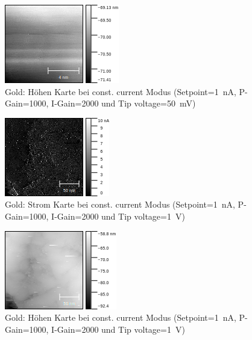 \documentclass[sn-mathphys-num,iicol]{sn-jnl}
\theoremstyle{thmstyleone}
\theoremstyle{thmstyletwo}
\theoremstyle{thmstylethree}
\begin{document}
\begin{figure}[t]
        \centering
        \includegraphics[width=.5\textwidth]{../data/Gold_10nm_50mV_z.png}
        \caption{Gold: Höhen Karte bei const. current Modus (Setpoint=\SI{1}{\nano A}, P-Gain=\SI{1000}{}, I-Gain=\SI{2000}{} und Tip voltage=\SI{50}{\milli V})} \label{fig:g10nm50mVz}
\end{figure}
\begin{figure}[t]
        \centering
        \includegraphics[width=.5\textwidth]{../data/Gold_200nm_current.png}
        \caption{Gold: Strom Karte bei const. current Modus (Setpoint=\SI{1}{\nano A}, P-Gain=\SI{1000}{}, I-Gain=\SI{2000}{} und Tip voltage=\SI{1}{V})} \label{fig:g200nmc}
\end{figure}
\begin{figure}[t]
        \centering
        \includegraphics[width=.5\textwidth]{../data/Gold_200nm_z.png}
        \caption{Gold: Höhen Karte bei const. current Modus (Setpoint=\SI{1}{\nano A}, P-Gain=\SI{1000}{}, I-Gain=\SI{2000}{} und Tip voltage=\SI{1}{V})} \label{fig:g200nmz}
\end{figure}
\end{document}
